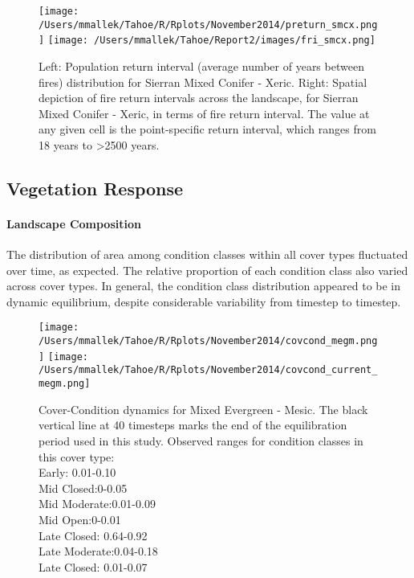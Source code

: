 \begin{figure}[p]
\texttt{[image: /Users/mmallek/Tahoe/R/Rplots/November2014/preturn\_smcx.png]}
\texttt{[image: /Users/mmallek/Tahoe/Report2/images/fri\_smcx.png]}
\caption{Left: Population return interval (average number of years between fires) distribution for Sierran Mixed Conifer - Xeric.  Right: Spatial depiction of fire return intervals across the landscape, for Sierran Mixed Conifer - Xeric, in terms of fire return interval. The value at any given cell is the point-specific return interval, which ranges from 18 years to \textgreater 2500 years.}
\label{preturn_smcx}
\end{figure}

\subsection{Vegetation Response}

\paragraph{Landscape Composition}

The distribution of area among condition classes within all cover types fluctuated over time, as expected. The relative proportion of each condition class also varied across cover types. In general, the condition class distribution appeared to be in dynamic equilibrium, despite considerable variability from timestep to timestep. 

\begin{figure}
\texttt{[image: /Users/mmallek/Tahoe/R/Rplots/November2014/covcond\_megm.png]}
\texttt{[image: /Users/mmallek/Tahoe/R/Rplots/November2014/covcond\_current\_megm.png]}
\caption{Cover-Condition dynamics for Mixed Evergreen - Mesic. The black vertical line at 40 timesteps marks the end of the equilibration period used in this study. Observed ranges for condition classes in this cover type: \\
Early: 0.01-0.10 \\
Mid Closed:0-0.05 \\
Mid Moderate:0.01-0.09\\
Mid Open:0-0.01 \\
Late Closed: 0.64-0.92 \\
Late Moderate:0.04-0.18 \\
Late Closed: 0.01-0.07}
\label{covcond_megm}
\end{figure}

